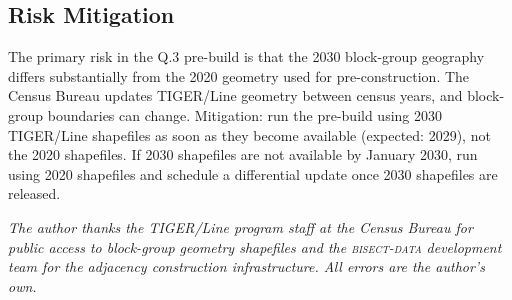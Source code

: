 \subsection{Risk Mitigation}

The primary risk in the Q.3 pre-build is that the 2030 block-group geography differs
substantially from the 2020 geometry used for pre-construction. The Census Bureau
updates TIGER/Line geometry between census years, and block-group boundaries can change.
Mitigation: run the pre-build using 2030 TIGER/Line shapefiles as soon as they become
available (expected: 2029), not the 2020 shapefiles. If 2030 shapefiles are not
available by January 2030, run using 2020 shapefiles and schedule a differential
update once 2030 shapefiles are released.

\bigskip
\noindent\textit{The author thanks the TIGER/Line program staff at the Census Bureau
for public access to block-group geometry shapefiles and the \textsc{bisect-data}
development team for the adjacency construction infrastructure. All errors are the author's own.}
